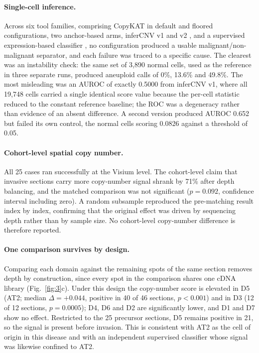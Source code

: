 \paragraph{Single-cell inference.} Across six tool families, comprising CopyKAT
\citep{gao2021copykat} in default and floored configurations, two anchor-based arms, inferCNV
v1 and v2 \citep{patel2014infercnv}, and a supervised expression-based classifier
\citep{scmalignantfinder2025}, no configuration produced a usable malignant/non-malignant
separator, and each failure was traced to a specific cause. The clearest was an instability
check: the same set of 3,890 normal cells, used as the reference in three separate runs,
produced aneuploid calls of 0\%, 13.6\% and 49.8\%. The most misleading was an AUROC of
exactly 0.5000 from inferCNV v1, where all 19,748 cells carried a single identical score
value because the per-cell statistic reduced to the constant reference baseline; the ROC was
a degeneracy rather than evidence of an absent difference. A second version produced AUROC
0.652 but failed its own control, the normal cells scoring 0.0826 against a threshold of
0.05.

\paragraph{Cohort-level spatial copy number.} All 25 cases ran successfully at the Visium
level. The cohort-level claim that invasive sections carry more copy-number signal shrank by
71\% after depth balancing, and the matched comparison was not significant ($p=0.092$,
confidence interval including zero). A random subsample reproduced the pre-matching result
index by index, confirming that the original effect was driven by sequencing depth rather
than by sample size. No cohort-level copy-number difference is therefore reported.

\paragraph{One comparison survives by design.} Comparing each domain against the remaining
spots of the same section removes depth by construction, since every spot in the comparison
shares one cDNA library (Fig.~\ref{fig:3}c). Under this design the copy-number score is
elevated in D5 (AT2; median $\Delta=+0.044$, positive in 40 of 46 sections, $p<0.001$) and
in D3 (12 of 12 sections, $p=0.0005$); D4, D6 and D2 are significantly lower, and D1 and D7
show no effect. Restricted to the 25 precursor sections, D5 remains positive in 21, so the
signal is present before invasion. This is consistent with AT2 as the cell of origin in this
disease and with an independent supervised classifier whose signal was likewise confined to
AT2.

